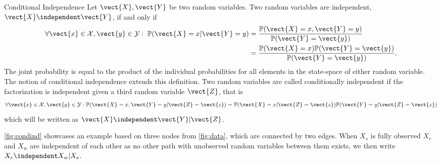 \begin{definition}{Conditional Independence}
    Let $\vect{X}, \vect{Y}$ be two random variables. Two random variables are independent,  $\vect{X} \independent \vect{Y}$, if and only if
    \begin{equation}
        \begin{split}
        \forall \vect{x} \in \mathcal{X}, \vect{y} \in \mathcal{Y}:  \; \mathbb{P}(\vect{X} = x \lvert \vect{Y} = y) &= \frac{\mathbb{P}(\vect{X} = x , \vect{Y} = y)}{\mathbb{P}(\vect{Y} = \vect{y})} \\
        &=  \frac{\mathbb{P}(\vect{X} = x) \mathbb{P}(\vect{Y} = \vect{y})}{\mathbb{P}(\vect{Y} = \vect{y})}.  \\
        \end{split}
    \end{equation} 
    The joint probability is equal to the product of the individual probabilities for all elements in the state-space of either random variable.
    The notion of conditional independence extends this definition. 
    Two random variables are called conditionally independent if the factorization is independent given a third random variable $\vect{Z}$, that is
    \begin{equation}
        \forall \vect{x} \in \mathcal{X}, \vect{y} \in \mathcal{Y}: \mathbb{P}(\vect{X} = x , \vect{Y} = y \lvert \vect{Z} = \vect{z}) =   \mathbb{P}(\vect{X} = x \lvert \vect{Z} = \vect{z}) \mathbb{P}(\vect{Y} = y \lvert \vect{Z} = \vect{z})
    \end{equation}
    which will be written as $\vect{X} \independent \vect{Y} \lvert \vect{Z}$.

    \autoref{fig:condind} showcases an example based on three nodes from \autoref{fig:data}, which are connected by two edges. 
    When $X_s$ is fully observed $X_r$ and $X_w$ are independent of each other as no other path with unobserved random variables between them exists, we then write $X_r \independent X_w \lvert X_s$.   
            

\end{definition}



